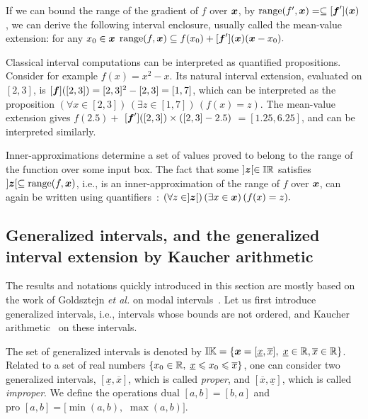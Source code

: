 \documentclass{sig-alternate-05-2015} %
\DeclareMathOperator{\range}{range}
\newcommand{\pro}{\mbox{pro }}
\def\bbr{{\Bbb R}}
\def\I{{\Bbb I \Bbb R}}
\def\K{{\Bbb I \Bbb K}}
\begin{document}
If we can bound the range of the gradient of $f$ over $\x$, by $\mbox{range}(f',\x)=\subseteq [\f'](\x)$, we can 
derive the following interval enclosure, usually called the mean-value extension: for any  $x_0 \in \x$
$    \mbox{range}(f,\x)  \subseteq f(x_0) +  [\f'](\x) (\x - x_0). $

Classical interval computations can be interpreted as quantified 
propositions. Consider for example $f(x)=x^2-x$.
Its natural interval extension, evaluated on $[2,3]$, is 
$[\f]([2,3])=[2,3]^2-[2,3]=[1,7]$, which can be interpreted as the proposition 
$ (\forall x \in [2,3]) \, (\exists z \in [1,7]) \, (f(x)=z).    $
The mean-value extension gives
$f(2.5) + $ $[\f']([2, 3]) \times ([2, 3] - 2.5)$ $ = [1.25, 6.25]$, and can be interpreted similarly.

Inner-approximations determine a set of values proved to belong to the range of the function over some input box. 
The fact that some $]\z[ \in \I$ satisfies $]\z[ \subseteq \range(f,\x)$, i.e., is an inner-approximation of the range 
of $f$ over $\x$, can again be written using quantifiers~: 
$ (\forall z \in ]\z[) \, (\exists x \in \x) \, (f(x)=z).    $

\subsection{Generalized intervals, and the generalized interval extension by Kaucher arithmetic}
\label{Kaucherar}

The results and notations quickly introduced in this section are mostly based on the work of Goldsztejn {\it et al.} 
on modal intervals~\cite{gold1}. 
Let us first introduce generalized intervals, i.e., intervals whose
bounds are not ordered, and Kaucher arithmetic~\cite{Kaucher} on these intervals.  

The set of generalized
intervals is denoted by $\K = \{ \x=[\underline{x},\overline{x}], \; \underline{x} \in \bbr, \overline{x}  \in \bbr\}$.
Related to a set of real numbers $\{x_0 \in \bbr, \;  \underline{x} \leqslant x_0 \leqslant  \overline{x} \}$, one can consider two generalized 
intervals, $[\underline{x},\overline{x}]$, which is called \emph{proper}, and $[\overline{x},\underline{x}]$, which is called 
\emph{improper}. We define the operations $\mbox{dual } [a,b]=[b,a]$ and 
$\pro [a,b]=[\min(a,b),$ $\max(a,b)]$. 
\end{document}
